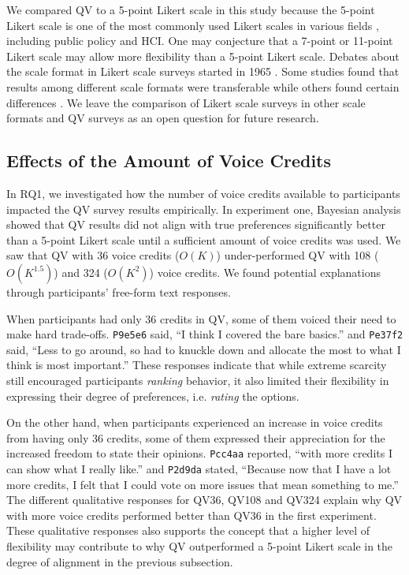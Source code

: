 We compared QV to a 5-point Likert scale in this study because the 5-point Likert scale is one of the most commonly used Likert scales in various fields \cite{malhotra2006basic}, including public policy and HCI. One may conjecture that a 7-point or 11-point Likert scale may allow more flexibility than a 5-point Likert scale. Debates about the scale format in Likert scale surveys started in 1965 \cite{komorita1965number}. Some studies found that results among different scale formats were transferable while others found certain differences \cite{dawes2008data}. We leave the comparison of Likert scale surveys in other scale formats and QV surveys as an open question for future research.

\subsection{Effects of the Amount of Voice Credits}
In RQ1, we investigated how the number of voice credits available to participants impacted the QV survey results empirically. In experiment one, Bayesian analysis showed that QV results did not align with true preferences significantly better than a 5-point Likert scale until a sufficient amount of voice credits was used. We saw that QV with 36 voice credits ($O(K)$) under-performed QV with 108 ($O(K^{1.5})$) and 324 ($O(K^{2})$) voice credits. We found potential explanations through participants' free-form text responses. 

When participants had only 36 credits in QV, some of them voiced their need to make hard trade-offs. \texttt{P9e5e6} said, ``I think I covered the bare basics.'' and \texttt{Pe37f2} said, ``Less to go around, so had to knuckle down and allocate the most to what I think is most important.'' These responses indicate that while extreme scarcity still encouraged participants \textit{ranking} behavior, it also limited their flexibility in expressing their degree of preferences, i.e. \textit{rating} the options.

On the other hand, when participants experienced an increase in voice credits from having only 36 credits, some of them expressed their appreciation for the increased freedom to state their opinions. \texttt{Pcc4aa} reported, ``with more credits I can show what I really like.'' and \texttt{P2d9da} stated, ``Because now that I have a lot more credits, I felt that I could vote on more issues that mean something to me.'' The different qualitative responses for QV36, QV108 and QV324 explain why QV with more voice credits performed better than QV36 in the first experiment. These qualitative responses also supports the concept that a higher level of flexibility may contribute to why QV outperformed a 5-point Likert scale in the degree of alignment in the previous subsection. 

